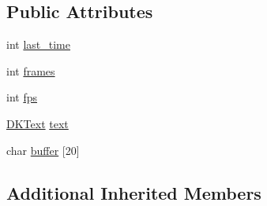 \subsection*{Public Attributes}
\begin{DoxyCompactItemize}
\item 
int \hyperlink{class_d_k_fps_a81fdec9aa60085f36c446adc3d91c33b}{last\-\_\-time}
\item 
int \hyperlink{class_d_k_fps_a3eb6560dcaa1a3c785529a9b4f43bdbc}{frames}
\item 
int \hyperlink{class_d_k_fps_a5f8b5f8798078286c811c47660bb0a89}{fps}
\item 
\hyperlink{class_d_k_text}{D\-K\-Text} \hyperlink{class_d_k_fps_afccd8fe1a5768b91d5cc9bfae97a3eee}{text}
\item 
char \hyperlink{class_d_k_fps_a1be88e6f38d56c7d81ee46bf0f86bdbd}{buffer} \mbox{[}20\mbox{]}
\end{DoxyCompactItemize}
\subsection*{Additional Inherited Members}


